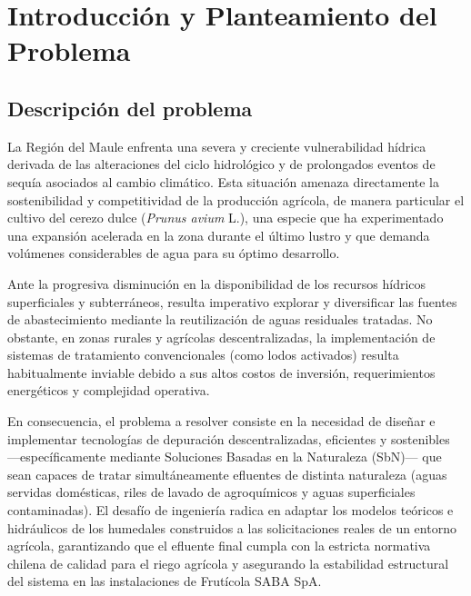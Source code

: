 \documentclass[12pt, letterpaper]{report}
\begin{document}
\newpage

\pagestyle{fancy}


\chapter{Introducción y Planteamiento del Problema}

\section{Descripción del problema}

La Región del Maule enfrenta una severa y creciente vulnerabilidad hídrica derivada de las alteraciones del ciclo hidrológico y de prolongados eventos de sequía asociados al cambio climático. Esta situación amenaza directamente la sostenibilidad y competitividad de la producción agrícola, de manera particular el cultivo del cerezo dulce (\textit{Prunus avium} L.), una especie que ha experimentado una expansión acelerada en la zona durante el último lustro y que demanda volúmenes considerables de agua para su óptimo desarrollo. 

Ante la progresiva disminución en la disponibilidad de los recursos hídricos superficiales y subterráneos, resulta imperativo explorar y diversificar las fuentes de abastecimiento mediante la reutilización de aguas residuales tratadas. No obstante, en zonas rurales y agrícolas descentralizadas, la implementación de sistemas de tratamiento convencionales (como lodos activados) resulta habitualmente inviable debido a sus altos costos de inversión, requerimientos energéticos y complejidad operativa.

En consecuencia, el problema a resolver consiste en la necesidad de diseñar e implementar tecnologías de depuración descentralizadas, eficientes y sostenibles ---específicamente mediante Soluciones Basadas en la Naturaleza (SbN)--- que sean capaces de tratar simultáneamente efluentes de distinta naturaleza (aguas servidas domésticas, riles de lavado de agroquímicos y aguas superficiales contaminadas). El desafío de ingeniería radica en adaptar los modelos teóricos e hidráulicos de los humedales construidos a las solicitaciones reales de un entorno agrícola, garantizando que el efluente final cumpla con la estricta normativa chilena de calidad para el riego agrícola y asegurando la estabilidad estructural del sistema en las instalaciones de Frutícola SABA SpA.
\end{document}
